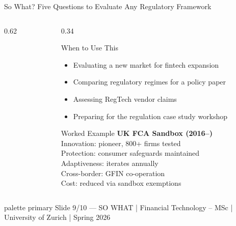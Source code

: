 \documentclass[aspectratio=169, 11pt]{beamer}
\newcommand{\bottomnote}[1]{%
  \vfill
  \begin{beamercolorbox}[wd=\textwidth,ht=2ex,dp=1ex]{palette primary}
    \tiny\hspace{1em}#1
  \end{beamercolorbox}}
\begin{document}
\begin{frame}{So What? Five Questions to Evaluate Any Regulatory Framework}
\begin{columns}[T]
\begin{column}{0.62\textwidth}

\end{column}
\begin{column}{0.34\textwidth}
\vspace{0.2em}
\begin{block}{When to Use This}
\scriptsize
\begin{itemize}
  \item Evaluating a new market for fintech expansion
  \item Comparing regulatory regimes for a policy paper
  \item Assessing RegTech vendor claims
  \item Preparing for the regulation case study workshop
\end{itemize}
\end{block}
\vspace{0.2em}
\begin{exampleblock}{Worked Example}
\scriptsize
\textbf{UK FCA Sandbox (2016--)}\\
Innovation: pioneer, 800+ firms tested\\
Protection: consumer safeguards maintained\\
Adaptiveness: iterates annually\\
Cross-border: GFIN co-operation\\
Cost: reduced via sandbox exemptions
\end{exampleblock}
\end{column}
\end{columns}

\bottomnote{Slide 9/10 --- SO WHAT | Financial Technology -- MSc | University of Zurich | Spring 2026}
\end{frame}
\end{document}
